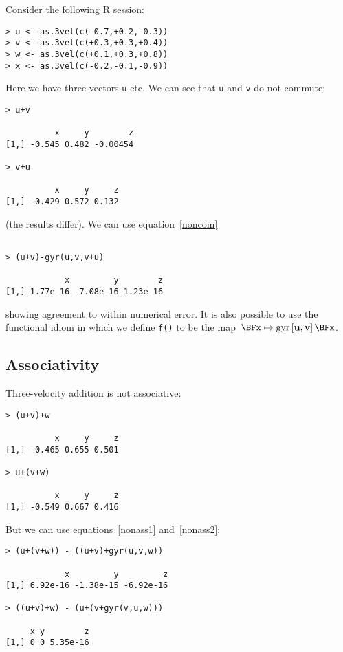 \documentclass[ijoc,nonblindrev]{informs3} %
\begin{document}
Consider the following R session:

\begin{verbatim}
> u <- as.3vel(c(-0.7,+0.2,-0.3))
> v <- as.3vel(c(+0.3,+0.3,+0.4))
> w <- as.3vel(c(+0.1,+0.3,+0.8))
> x <- as.3vel(c(-0.2,-0.1,-0.9))

\end{verbatim}

Here we have three-vectors {\tt u} etc.  We can see that {\tt u} and
{\tt v} do not commute:

\begin{verbatim}
> u+v

          x     y        z
[1,] -0.545 0.482 -0.00454

> v+u

          x     y     z
[1,] -0.429 0.572 0.132

\end{verbatim}

(the results differ).  We can use equation~\ref{noncom}

\begin{verbatim}

> (u+v)-gyr(u,v,v+u)

            x         y        z 
[1,] 1.77e-16 -7.08e-16 1.23e-16

\end{verbatim}

showing agreement to within numerical error.  It is also possible to
use the functional idiom in which we define {\tt f()} to be the
map~$\BFx\mapsto\gyr{u}{v}\BFx$.

\subsection{Associativity}

Three-velocity addition is not associative:

\begin{verbatim}
> (u+v)+w

          x     y     z
[1,] -0.465 0.655 0.501

> u+(v+w)

          x     y     z 
[1,] -0.549 0.667 0.416

\end{verbatim}

But we can use equations~\ref{nonass1} and~\ref{nonass2}:

\begin{verbatim}
> (u+(v+w)) - ((u+v)+gyr(u,v,w))

            x         y         z
[1,] 6.92e-16 -1.38e-15 -6.92e-16

> ((u+v)+w) - (u+(v+gyr(v,u,w)))

     x y        z
[1,] 0 0 5.35e-16

\end{verbatim}
\end{document}
